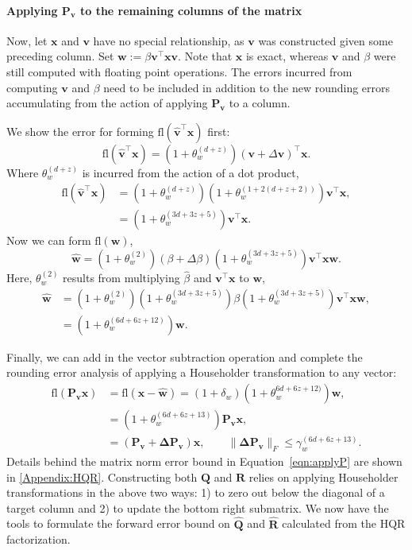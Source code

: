\documentclass[review,onefignum,onetabnum]{siamart190516}
\newcommand{\dd}{\delta}
\newcommand{\tth}{\theta}
\newcommand{\bb}[1]{\mathbf{#1}}
\newcommand{\fl}{\mathrm{fl}}
\begin{document}
\paragraph{Applying $\bb{P}_{\bb{v}}$ to the remaining columns of the matrix}
Now, let $\bb{x}$ and $\bb{v}$ have no special relationship, as $\bb{v}$ was constructed given some preceding column.
Set $\bb{w}:= \beta \bb{v}^{\top}\bb{x}\bb{v}$.
Note that $\bb{x}$ is exact, whereas $\bb{v}$ and $\beta$ were still computed with floating point operations. 
The errors incurred from computing $\bb{v}$ and $\beta$ need to be included in addition to the new rounding errors accumulating from the action of applying $\bb{P}_{\bb{v}}$ to a column.

We show the error for forming $\fl\left(\bb{\hat{v}}^{\top}\bb{x}\right)$ first:
\begin{equation*}
\fl\left(\bb{\hat{v}}^{\top}\bb{x}\right) = (1+\tth_w^{(d+z)})(\bb{v}+\Delta\bb{v})^{\top}\bb{x}.
\end{equation*}
Where $\tth_w^{(d+z)}$ is incurred from the action of a dot product,
\begin{align*}
\fl\left(\bb{\hat{v}}^{\top}\bb{x}\right)&= (1+\tth_w^{(d+z)})(1+\tth_w^{(1+2(d+z+2))})\bb{v}^{\top}\bb{x},\\
&= (1+\tth_w^{(3d+3z+5)})\bb{v}^{\top}\bb{x}.
\end{align*}
Now we can form $\fl(\bb{w})$,
\begin{equation*}
\bb{\hat{w}} =(1+\tth_w^{(2)})(\beta+\Delta\beta)(1+\tth_w^{(3d+3z+5)})\bb{v}^{\top}\bb{x}\bb{w}.
\end{equation*}
Here, $\tth_w^{(2)}$ results from multiplying  $\hat{\beta}$ and $\bb{v}^{\top}\bb{x}$ to $\bb{w}$,
\begin{align*}
\bb{\hat{w}} &= (1+\tth_w^{(2)})(1+\tth_w^{(3d+3z+5)})\beta(1+\tth_w^{(3d+3z+5)})\bb{v}^{\top}\bb{x}\bb{w},\\
&= (1+\tth_w^{(6d+6z+12)})\bb{w}.
\end{align*}

Finally, we can add in the vector subtraction operation and complete the rounding error analysis of applying a Householder transformation to any vector:
\begin{align}
\fl(\bb{P}_{\bb{v}}\bb{x}) & = \fl(\bb{x}-\bb{\hat{w}}) = (1+\dd_w)(1+\tth_w^{6d+6z+12)})\bb{w}, \\
&= (1+\tth_w^{(6d+6z+13)})\bb{P}_{\bb{v}}\bb{x},\\
&= (\bb{P_v} +\bb{\Delta P_v})\bb{x},\qquad \|\bb{\Delta P_v}\|_F \leq \gamma_w^{(6d+6z+13)}. \label{eqn:applyP}
\end{align}
Details behind the matrix norm error bound in Equation~\ref{eqn:applyP} are shown in \ref{Appendix:HQR}.
Constructing both $\bb{Q}$ and $\bb{R}$ relies on applying Householder transformations in the above two ways: 1) to zero out below the diagonal of a target column and 2) to update the bottom right submatrix. 
We now have the tools to formulate the forward error bound on $\hat{\bb{Q}}$ and $\hat{\bb{R}}$ calculated from the HQR factorization.
\end{document}
